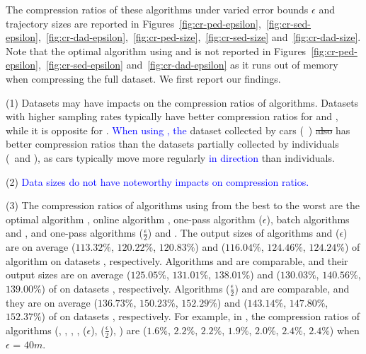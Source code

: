 The compression ratios of these algorithms under varied error bounds $\epsilon$ and trajectory sizes are reported in Figures~\ref{fig:cr-ped-epsilon},~\ref{fig:cr-sed-epsilon},~\ref{fig:cr-dad-epsilon},~\ref{fig:cr-ped-size},~\ref{fig:cr-sed-size} and~\ref{fig:cr-dad-size}.
{Note that the optimal algorithm using \sed and \dad is not reported in Figures~\ref{fig:cr-ped-epsilon},~\ref{fig:cr-sed-epsilon} and~\ref{fig:cr-dad-epsilon} as it runs out of memory when compressing the full dataset}. We first report our findings.


\sstab(1)  {Datasets may have impacts on the compression ratios of \lsa algorithms. Datasets with higher sampling rates typically have better compression ratios for \ped and \sed, while it is opposite for \dad. \textcolor{blue}{When using \dad, the} dataset collected by cars (\eg~\ucar) \sout{also} has better compression ratios than the datasets partially collected by individuals (\eg~\geolife and \mopsi), as cars typically move more regularly \textcolor{blue}{in direction} than individuals. }

\sstab(2) \textcolor{blue}{Data sizes do not have noteworthy impacts on compression ratios.}

\sstab(3) The compression ratios of algorithms using \ped from the best
to the worst are the optimal algorithm \opt, online algorithm \bqsa, one-pass algorithm \siped($\epsilon$), batch algorithms \tpa and \dpa, and one-pass algorithms \siped($\frac{\epsilon}{2}$) and \operb.
The output sizes of algorithms \bqsa and \siped({$\epsilon$}) are on average
($113.32\%$, $120.22\%$, $120.83\%$) and ($116.04\%$, $124.46\%$, $124.24\%$) of algorithm \opt
on datasets \dSets, respectively.
Algorithms \tpa and \dpa are comparable, and their output sizes are on average
($125.05\%$, $131.01\%$, $138.01\%$) and ($130.03\%$, $140.56\%$, $139.00\%$) of \opt
on datasets \dSets, respectively.
Algorithms \siped($\frac{\epsilon}{2}$) and \operb are comparable, and they are on average
($136.73\%$, $150.23\%$, $152.29\%$) and ($143.14\%$, $147.80\%$, $152.37\%$) of \opt on datasets \dSets, respectively.
%
For example, in \mopsi, the compression ratios of algorithms
(\opt, \tpa, \dpa, \bqsa, \siped(${\epsilon}$), \siped($\frac{\epsilon}{2}$), \operb ) are ($1.6\%$, $2.2\%$, $2.2\%$, $1.9\%$, $2.0\%$, $2.4\%$, $2.4\%$) when $\epsilon$ = $40m$.
%


